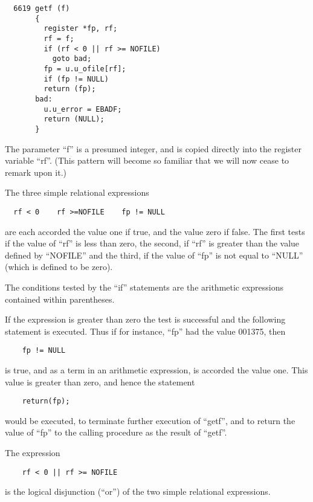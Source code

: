 \begin{verbatim}
  6619 getf (f)
       {
         register *fp, rf;
         rf = f;
         if (rf < 0 || rf >= NOFILE)
           goto bad;
         fp = u.u_ofile[rf];
         if (fp != NULL)
         return (fp);
       bad:
         u.u_error = EBADF;
         return (NULL);
       }
\end{verbatim}

The parameter ``f'' is a presumed
integer, and is copied directly into
the register variable ``rf''. (This pattern will become so familiar that we
will now cease to remark upon it.)

\noindent The three simple relational expressions

\begin{verbatim}
  rf < 0    rf >=NOFILE    fp != NULL
\end{verbatim}

\noindent are each accorded the value one if
true, and the value zero if false. The
first tests if the value of ``rf'' is
less than zero, the second, if ``rf'' is
greater than the value defined by
``NOFILE'' and the third, if the value of
``fp'' is not equal to ``NULL'' (which is
defined to be zero).

The conditions tested by the ``if''
statements are the arithmetic expressions contained within parentheses.

If the expression is greater than zero
the test is successful and the following statement is executed. Thus if for
instance, ``fp'' had the value 001375,
then

\begin{verbatim}
    fp != NULL
\end{verbatim}

\noindent is true, and as a term in an arithmetic
expression, is accorded the value one.
This value is greater than zero, and
hence the statement

\begin{verbatim}
    return(fp);
\end{verbatim}

\noindent would be executed, to terminate further
execution of ``getf'', and to return the
value of ``fp'' to the calling procedure
as the result of ``getf''.


The expression

\begin{verbatim}
    rf < 0 || rf >= NOFILE
\end{verbatim}


\noindent is the logical disjunction (``or'') of
the two simple relational expressions.

